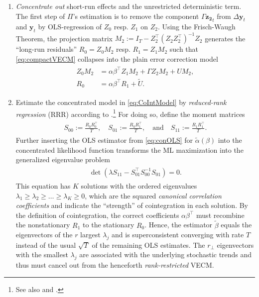 \begin{enumerate}[label=\textbf{\arabic*.}]
	\item \textit{Concentrate out} short-run effects and the unrestricted deterministic term. The first step of $ \Pi $'s estimation is to remove the component $ \Gamma \boldsymbol{z_2}_t $ from $ \Delta \boldsymbol{y}_t $ and $ \boldsymbol{y}_t $ by OLS-regression of $ Z_0 $ resp. $ Z_1 $ on $ Z_{2} $. Using the Frisch-Waugh Theorem, the projection matrix $ M_2 := I_T - Z_2^\top (Z^{\ }_2 Z_2^\top)^{-1} Z^{\ }_2 $ generates the ``long-run residuals'' $ R_{0} = Z_{0} M_2 $ resp. $ R_{1} = Z_{1} M_2 $ such that \eqref{eq:compactVECM} collapses into the plain error correction model
	\begin{align} \label{eq:CoIntModel}
	\begin{split}
		Z_{0} M_2 & = \alpha\beta^\top Z_{1} M_2 + \Gamma Z_{2} M_2 + U M_2, \\
		R_{0} & = \alpha\beta^\top R_{1} + \widetilde{U}.
	\end{split}
	\end{align} 
	\item Estimate the concentrated model in \eqref{eq:CoIntModel} by \textit{reduced-rank regression} (RRR) according to \citet{Anderson1951}.\footnote{See also \citet[Ch.~12.7]{Anderson2003} and \citet{Izenman1975}.} For doing so, define the moment matrices
	\begin{align} \label{eq:RRRmomat}
	\begin{split}
		S_{00} := \frac{R^{\ }_0 R_0^\top}{T}, \quad S_{01} := \frac{R^{\ }_0 R_1^\top}{T}, \quad \text{and} \quad S_{11} := \frac{R^{\ }_1 R_1^\top}{T}.
	\end{split}
	\end{align}
	Further inserting the OLS estimator from \eqref{eq:conOLS} for $ \widetilde{\alpha}(\beta) $ into the concentrated likelihood function transforms the ML maximization into the generalized eigenvalue problem
	\begin{align} \label{eq:RRReigen}
	\begin{split}
		\det \left( \lambda S_{11}^{\ } - S_{01}^\top S_{00}^{-1} S_{01}^{\ } \right) = 0.
	\end{split}
	\end{align} 
	This equation has $ K $ solutions with the ordered eigenvalues $ \lambda_1 \geq \lambda_2 \geq \ldots \geq \lambda_K \geq 0 $, which are the squared \textit{canonical correlation coefficients} and indicate the ``strength'' of cointegration in each solution. By the definition of cointegration, the correct coefficients $ \alpha\beta^\top $ must recombine the nonstationary $ R_{1} $ to the stationary $ R_{0} $. Hence, the estimator $ \widetilde{\beta} $ equals the eigenvectors of the $ r $ largest $ \lambda_j $ and is superconsistent converging with rate $ T $ instead of the usual $ \sqrt{T} $ of the remaining OLS estimates. The $ r_\perp $ eigenvectors with the smallest $ \lambda_j $ are associated with the underlying stochastic trends and thus must cancel out from the henceforth \textit{rank-restricted} VECM.
	

\end{enumerate}
